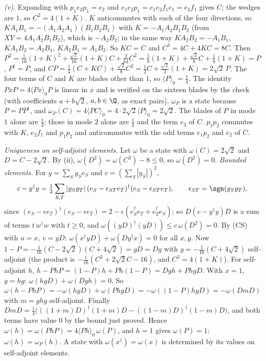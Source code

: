\emph{(v).} Expanding with $p_{1}e_{2}p_{1} = e_{2}$ and $e_{1}e_{2}p_{1} = e_{1}e_{2}f_{1}e_{1} = e_{2}f_{1}$ gives $C$; the wedges are $1$, so $C^{2} = 4(1 + K)$. $K$ anticommutes with each of the four directions, so $KA_{1}B_{1} = -(A_{1}A_{2}A_{1})(B_{1}B_{2}B_{1})$ with $K = -A_{1}A_{2}B_{1}B_{2}$ (from $XY = 4A_{1}A_{2}B_{1}B_{2}$), which is $-A_{2}B_{2}$; in the same way $KA_{2}B_{2} = -A_{1}B_{1}$, $KA_{1}B_{2} = A_{2}B_{1}$, $KA_{2}B_{1} = A_{1}B_{2}$. So $KC = C$ and $C^{3} = 4C + 4KC = 8C$. Then $P^{2} = \tfrac{1}{16}(1 + K)^{2} + \tfrac{\sqrt{2}}{16}(1 + K)C + \tfrac{2}{64}C^{2} = \tfrac18(1 + K) + \tfrac{\sqrt{2}}{8}C + \tfrac18(1 + K) = P$, $P^{\dagger} = P$, and $CP = \tfrac14(C + KC) + \tfrac{\sqrt{2}}{8}C^{2} = \tfrac12C + \tfrac{\sqrt{2}}{2}(1 + K) = 2\sqrt{2}\,P$. The four terms of $C$ and $K$ are blades other than $1$, so $\langle P\rangle_{0} = \tfrac14$. The identity $PxP = 4\langle Px\rangle_{0}P$ is linear in $x$ and is verified on the sixteen blades by the check (with coefficients $a + b\sqrt{2}$, $a, b \in \Q$, as exact pairs). $\omega_{P}$ is a state because $P = PP^{\dagger}$, and $\omega_{P}(C) = 4\langle PC\rangle_{0} = 4 \cdot 2\sqrt{2}\langle P\rangle_{0} = 2\sqrt{2}$. The blades of $P$ in mode $1$ alone are $\tfrac14$; those in mode $2$ alone are $\tfrac14$ and the term $e_{2}$ of $C$. $p_{1}p_{2}$ commutes with $K$, $e_{2}f_{1}$ and $p_{1}p_{2}$ and anticommutes with the odd terms $e_{1}p_{2}$ and $e_{2}$ of $C$.

\emph{Uniqueness on self-adjoint elements.} Let $\omega$ be a state with $\omega(C) = 2\sqrt{2}$ and $D = C - 2\sqrt{2}$. By (ii), $\omega(D^{2}) = \omega(C^{2}) - 8 \le 0$, so $\omega(D^{2}) = 0$. \emph{Bounded elements.} For $y = \sum_{S}y_{S}e_{S}$ and $c = (\sum_{S}|y_{S}|)^{2}$,
\[
c - y^{\dagger}y = \tfrac12\sum_{S,T}|y_{S}y_{T}|\,(e_{S} - \epsilon_{ST}e_{T})^{\dagger}(e_{S} - \epsilon_{ST}e_{T}), \qquad \epsilon_{ST} = \sgn(y_{S}y_{T}),
\]
since $(e_{S} - \epsilon e_{T})^{\dagger}(e_{S} - \epsilon e_{T}) = 2 - \epsilon(e_{S}^{\dagger}e_{T} + e_{T}^{\dagger}e_{S})$; so $D(c - y^{\dagger}y)D$ is a sum of terms $t\,w^{\dagger}w$ with $t \ge 0$, and $\omega((yD)^{\dagger}(yD)) \le c\,\omega(D^{2}) = 0$. By (CS) with $u = x$, $v = yD$: $\omega(x^{\dagger}yD) + \omega(Dy^{\dagger}x) = 0$ for all $x, y$. Now $1 - P = -\tfrac{1}{16}(C - 2\sqrt{2})(C + 4\sqrt{2}) = gD = Dg$ with $g = -\tfrac{1}{16}(C + 4\sqrt{2})$ self-adjoint (the product is $-\tfrac{1}{16}(C^{2} + 2\sqrt{2}C - 16)$, and $C^{2} = 4(1 + K)$). For self-adjoint $h$, $h - PhP = (1 - P)h + Ph(1 - P) = Dgh + PhgD$. With $x = 1$, $y = hg$: $\omega(hgD) + \omega(Dgh) = 0$. So $\omega(h - PhP) = -\omega(hgD) + \omega(PhgD) = -\omega((1 - P)hgD) = -\omega(DmD)$ with $m = ghg$ self-adjoint. Finally $DmD = \tfrac14\bigl(((1 + m)D)^{\dagger}(1 + m)D - ((1 - m)D)^{\dagger}(1 - m)D\bigr)$, and both terms have value $0$ by the bound just proved. Hence $\omega(h) = \omega(PhP) = 4\langle Ph\rangle_{0}\,\omega(P)$, and $h = 1$ gives $\omega(P) = 1$: $\omega(h) = \omega_{P}(h)$. A state with $\omega(x^{\dagger}) = \omega(x)$ is determined by its values on self-adjoint elements.
